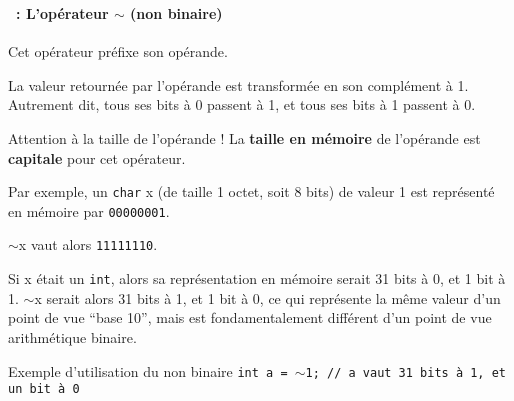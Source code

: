 \begin{frame}[containsverbatim]
  \frametitle{\secname}
  \framesubtitle{\subsecname~: L'opérateur $\sim$ (non binaire)} 

  Cet opérateur préfixe son opérande.
  \vspace{0.3cm}
  \par
  La valeur retournée par l'opérande est transformée en son complément à 1. Autrement dit, tous ses bits à 0 passent à 1, et tous ses bits à 1 passent à 0.
  {\small\begin{alertblock}{Attention à la taille de l'opérande !}
    La \textbf{taille en mémoire} de l'opérande est \textbf{capitale} pour cet opérateur.
    \par
    Par exemple, un \verb|char| x (de taille 1 octet, soit 8 bits) de valeur 1 est représenté en mémoire par \texttt{00000001}. 
    \par
    $\sim$x vaut alors \texttt{11111110}.
    \par
    Si x était un \verb|int|, alors sa représentation en mémoire serait 31 bits à 0, et 1 bit à 1. $\sim$x serait alors 31 bits à 1, et 1 bit à 0, ce qui
    représente la même valeur d'un point de vue ``base 10'', mais est fondamentalement différent d'un point de vue arithmétique binaire.
  \end{alertblock}
  \begin{exampleblock}{Exemple d'utilisation du non binaire}
    \verb|int a = |$\sim$\verb|1; // a vaut 31 bits à 1, et un bit à 0|
  \end{exampleblock}}
\end{frame}

